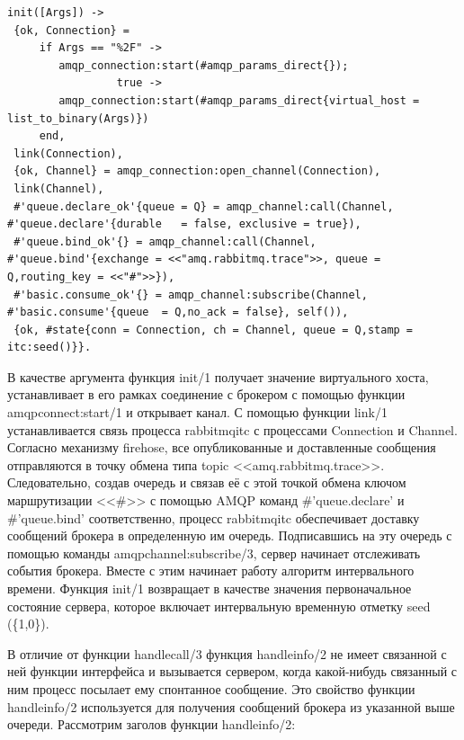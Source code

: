 \begin{lstlisting}
init([Args]) ->
 {ok, Connection} = 
     if Args == "%2F" ->
        amqp_connection:start(#amqp_params_direct{});
                 true ->
        amqp_connection:start(#amqp_params_direct{virtual_host = list_to_binary(Args)})
     end,
 link(Connection),
 {ok, Channel} = amqp_connection:open_channel(Connection),
 link(Channel),
 #'queue.declare_ok'{queue = Q} = amqp_channel:call(Channel, #'queue.declare'{durable   = false, exclusive = true}),
 #'queue.bind_ok'{} = amqp_channel:call(Channel, #'queue.bind'{exchange = <<"amq.rabbitmq.trace">>, queue = Q,routing_key = <<"#">>}),
 #'basic.consume_ok'{} = amqp_channel:subscribe(Channel, #'basic.consume'{queue  = Q,no_ack = false}, self()),
 {ok, #state{conn = Connection, ch = Channel, queue = Q,stamp = itc:seed()}}.
\end{lstlisting}
В качестве аргумента функция init/1 получает значение виртуального хоста, устанавливает в его рамках соединение с брокером с помощью функции amqp\underline{\hspace{0.25cm}}connect:start/1 и открывает канал. С помощью функции link/1 устанавливается связь процесса rabbitmq\underline{\hspace{0.25cm}}itc с процессами Connection и Channel. Согласно механизму firehose, все опубликованные и доставленные сообщения отправляются в точку обмена типа topic <<amq.rabbitmq.trace>>. Следовательно, создав очередь и связав её с этой точкой обмена ключом маршрутизации <<\#>> с помощью AMQP команд \#'queue.declare' и \#'queue.bind' соответственно, процесс rabbitmq\underline{\hspace{0.25cm}}itc обеспечивает доставку сообщений брокера в определенную им очередь. Подписавшись на эту очередь с помощью команды amqp\underline{\hspace{0.25cm}}channel:subscribe/3, сервер начинает отслеживать события брокера. Вместе с этим начинает работу алгоритм интервального времени. Функция init/1 возвращает в качестве значения первоначальное состояние сервера, которое включает интервальную временную отметку seed (\{1,0\}).\par
В отличие от функции handle\underline{\hspace{0.25cm}}call/3 функция handle\underline{\hspace{0.25cm}}info/2 не имеет связанной с ней функции интерфейса и вызывается сервером, когда какой-нибудь связанный с ним процесс посылает ему спонтанное сообщение. Это свойство функции handle\underline{\hspace{0.25cm}}info/2 используется для получения сообщений брокера из указанной выше очереди. Рассмотрим заголов функции handle\underline{\hspace{0.25cm}}info/2:
